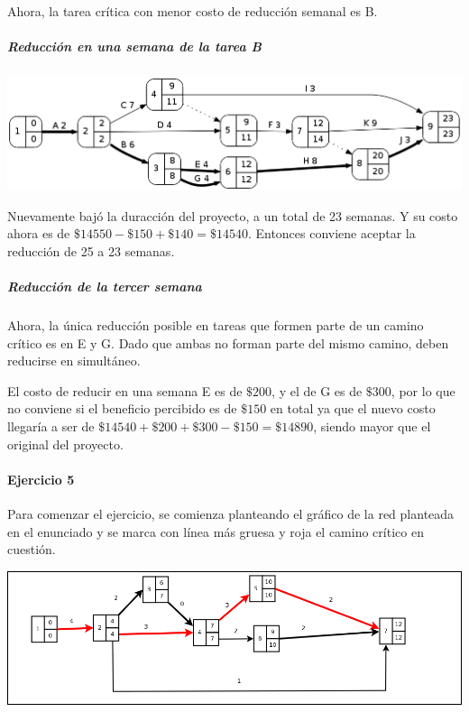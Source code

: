 \documentclass[a4paper,10pt]{article}
\begin{document}
  Ahora, la tarea crítica con menor costo de reducción semanal es B.

  \subparagraph {Reducción en una semana de la tarea B}
  \begin{center}
    \includegraphics[scale=0.4,keepaspectratio=true]{img/ej3-2.png} 
  \end{center}

  Nuevamente bajó la duracción del proyecto, a un total de 23 semanas. Y su costo ahora es de $\$14550 - \$150 + \$140 = \$14540$. Entonces conviene aceptar la reducción de 25 a 23 semanas.

  \subparagraph {Reducción de la tercer semana}
  Ahora, la única reducción posible en tareas que formen parte de un camino crítico es en E y G. Dado que ambas no forman parte del mismo camino, deben reducirse en simultáneo.

  El costo de reducir en una semana E es de $\$200$, y el de G es de $\$300$, por lo que no conviene si el beneficio percibido es de $\$150$ en total ya que el nuevo costo llegaría a ser de $\$14540 + \$200 + \$300 - \$150 = \$14890$, siendo mayor que el original del proyecto.



\paragraph{Ejercicio 5}

Para comenzar el ejercicio, se comienza planteando el gr\'afico de la red planteada en el enunciado y se marca con l\'inea m\'as gruesa y roja el camino cr\'itico en cuesti\'on.

  \begin{center}
    \includegraphics[scale=0.4,keepaspectratio=true]{img/ej5-red.png} 
  \end{center}
\end{document}

